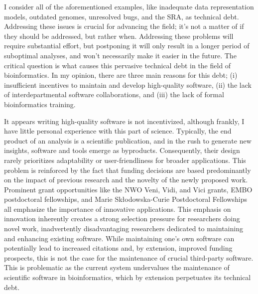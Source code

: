I consider all of the aforementioned examples, like inadequate data representation models, outdated genomes, unresolved bugs, and the SRA, as technical debt. Addressing these issues is crucial for advancing the field; it's not a matter of if they should be addressed, but rather when. Addressing these problems will require substantial effort, but postponing it will only result in a longer period of suboptimal analyses, and won't necessarily make it easier in the future. The critical question is what causes this pervasive technical debt in the field of bioinformatics. In my opinion, there are three main reasons for this debt; (i) insufficient incentives to maintain and develop high-quality software, (ii) the lack of interdepartmental software collaborations, and (iii) the lack of formal bioinformatics training.

It appears writing high-quality software is not incentivized, although frankly, I have little personal experience with this part of science. Typically, the end product of an analysis is a scientific publication, and in the rush to generate new insights, software and tools emerge as byproducts. Consequently, their design rarely prioritizes adaptability or user-friendliness for broader applications. This problem is reinforced by the fact that funding decisions are based predominantly on the impact of previous research and the novelty of the newly proposed work. Prominent grant opportunities like the NWO Veni, Vidi, and Vici grants, EMBO postdoctoral fellowships, and Marie Skłodowska-Curie Postdoctoral Fellowships all emphasize the importance of innovative applications. This emphasis on innovation inherently creates a strong selection pressure for researchers doing novel work, inadvertently disadvantaging researchers dedicated to maintaining and enhancing existing software. While maintaining one's own software can potentially lead to increased citations and, by extension, improved funding prospects, this is not the case for the maintenance of crucial third-party software. This is problematic as the current system undervalues the maintenance of scientific software in bioinformatics, which by extension perpetuates its technical debt.

